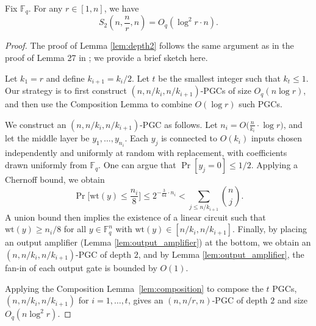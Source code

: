 \documentclass[11pt]{article}
\newcommand{\weight}{\mathrm{wt}}
\theoremstyle{named}
\begin{document}
\begin{lemma} 
\label{lem:depth2}
Fix $\mathbb{F}_q$. For any $r \in [1, n]$, we have
\[
S_2\left(n, \frac{n}{r}, n\right) = O_q\left(\log^2 r \cdot n\right).
\]
\end{lemma}
\begin{proof}
The proof of Lemma \ref{lem:depth2} follows the same argument as in the proof of Lemma 27 in \cite{GHK+12}; we provide a brief sketch here.

Let $k_1 = r$ and define $k_{i+1} = k_i / 2$. Let $t$ be the smallest integer such that $k_t \le 1$.  
Our strategy is to first construct $(n, n/k_i, n/k_{i+1})$-PGCs of size $O_q(n \log r)$, and then use the Composition Lemma to combine $O(\log r)$ such PGCs.

We construct an $(n, n/k_i, n/k_{i+1})$-PGC as follows. Let $n_i = O\bigl(\frac{n}{k_i} \cdot \log r\bigr)$, and let the middle layer be $y_1, \ldots, y_{n_i}$. Each $y_j$ is connected to $O(k_i)$ inputs chosen independently and uniformly at random with replacement, with coefficients drawn uniformly from $\mathbb{F}_q$. One can argue that $\Pr[y_j = 0] \le 1/2$. Applying a Chernoff bound, we obtain
\[
\Pr\bigl[\weight(y) \le \frac{n_i}{8}\bigr] \le 2^{-\frac{3}{64} \cdot n_i} <
\sum_{j \le n/k_{i+1}} \binom{n}{j}.
\]
A union bound then implies the existence of a linear circuit such that $\weight(y) \ge n_i/8$ for all $y \in \mathbb{F}_q^n$ with $\weight(y) \in [n/k_i, n/k_{i+1}]$. Finally, by placing an output amplifier (Lemma \ref{lem:output_amplifier}) at the bottom, we obtain an $(n, n/k_i, n/k_{i+1})$-PGC of depth $2$, and by Lemma \ref{lem:output_amplifier}, the fan-in of each output gate is bounded by $O(1)$.

Applying the Composition Lemma~\ref{lem:composition} to compose the $t$ 
PGCs, $(n, n/k_i, n/k_{i+1})$ for $i = 1, \ldots, t$, gives an $(n, n/r, n)$-PGC of depth $2$ and size 
$O_q(n \log^2 r)$.
\end{proof}
\end{document}
